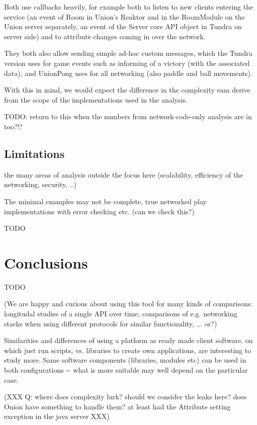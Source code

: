 \documentclass[conference]{IEEEtran}
\begin{document}
Both use callbacks heavily, for example both to listen to new clients
entering the service (an event of Room in Union's Reaktor and in the
RoomModule on the Union server separately, an event of the Server core
API object in Tundra on server side) and to attribute changes coming
in over the network.

They both also allow sending simple ad-hoc custom messages, which the
Tundra version uses for game events such as informing of a victory
(with the associated data), and UnionPong uses for all networking
(also paddle and ball movements).

With this in mind, we would expect the difference in the complexity
sum derive from the scope of the implementations used in the analysis.

TODO: return to this when the numbers from network-code-only analysis are in too?!?


\subsection{Limitations%
  \label{limitations}%
}

the many areas of analysis outside the focus here (scalability,
efficiency of the networking, security, ..)

The minimal examples may not be complete, true networked play
implementations with error checking etc. (can we check this?)

TODO


\section{Conclusions%
  \label{conclusions}%
}

TODO

(We are happy and curious about using this tool for many kinds of
comparisons: longitudal studies of a single API over time, comparisons
of e.g. networking stacks when using different protocols for similar
functionality, ... or?)

Similarities and differences of using a platform as ready made client
software, on which just run scripts, vs. libraries to create own
applications, are interesting to study more. Same software components
(libraries, modules etc) can be used in both configurations -{}- what is
more suitable may well depend on the particular case.

(XXX Q: where does complexity lurk? should we consider the leaks here?
does Onion have something to handle them? at least had the Attribute
setting exception in the java server XXX)
\end{document}
